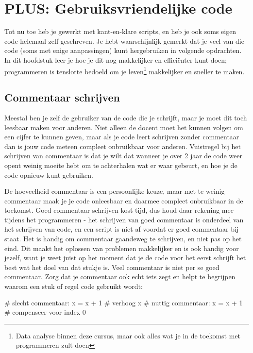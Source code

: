 \documentclass[a4paper,11pt, fleqn]{article}
\newcommand{\ditwc}{Naam van het huidige werkcollege}
\begin{document}
\clearpage

\iffalse
\renewcommand{\ditwc}{PLUS: Gebruiksvriendelijke code}
\section[PLUS: Gebruiksvriendelijke code]{\ditwc}

Tot nu toe heb je gewerkt met kant-en-klare scripts, en heb je ook soms eigen code helemaal zelf geschreven. Je hebt waarschijnlijk gemerkt dat je veel van die code (soms met enige aanpassingen) kunt hergebruiken in volgende opdrachten. In dit hoofdstuk leer je hoe je dit nog makkelijker en effici\"enter kunt doen; programmeren is tenslotte bedoeld om je leven\footnote{Data analyse binnen deze cursus, maar ook alles wat je in de toekomst met programmeren zult doen} makkelijker en sneller te maken.

\subsection{Commentaar schrijven}
Meestal ben je zelf de gebruiker van de code die je schrijft, maar je moet dit toch leesbaar maken voor anderen. Niet alleen de docent moet het kunnen volgen om een cijfer te kunnen geven, maar als je code leert schrijven zonder commentaar dan is jouw code meteen compleet onbruikbaar voor anderen. Vuistregel bij het schrijven van commentaar is dat je wilt dat wanneer je over 2 jaar de code weer opent weinig moeite hebt om te achterhalen wat er waar gebeurt, en hoe je de code opnieuw kunt gebruiken.

De hoeveelheid commentaar is een persoonlijke keuze, maar met te weinig commentaar maak je je code onleesbaar en daarmee compleet onbruikbaar in de toekomst. Goed commentaar schrijven kost tijd, dus houd daar rekening mee tijdens het programmeren - het schrijven van goed commentaar is onderdeel van het schrijven van code, en een script is niet af voordat er goed commentaar bij staat. Het is handig om commentaar gaandeweg te schrijven, en niet pas op het eind. Dit maakt het oplossen van problemen makkelijker en is ook handig voor jezelf, want je weet juist op het moment dat je de code voor het eerst schrijft het best wat het doel van dat stukje is.
Veel commentaar is niet per se goed commentaar. Zorg dat je commentaar ook echt iets zegt en helpt te begrijpen waarom een stuk of regel code gebruikt wordt:
\begin{python}
# slecht commentaar:
x = x + 1         # verhoog x
# nuttig commentaar:
x = x + 1         # compenseer voor index 0
\end{python}
\end{document}
